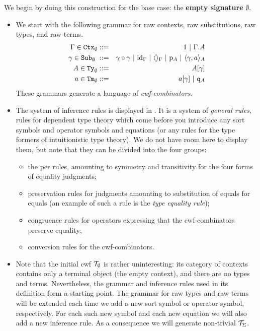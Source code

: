 \documentclass{lmcs}
\def\id{\mathrm{id}}
\begin{document}
We begin by doing this construction for the base case: the {\bf empty signature} $\emptyset$. 
\begin{itemize}
\item 
We start with the following grammar for raw contexts, raw substitutions, raw types, and raw terms.
\begin{eqnarray*}
\Gamma \in \RawCtx_\emptyset &::=& 1  \ |\ \Gamma\cext A\\
\gamma \in \RawSub_\emptyset  \ &::=& \gamma \circ \gamma \ |\ \id_\Gamma \ |\ \langle\rangle_\Gamma \ |\ \p_{A} \ |\ \langle \gamma, a \rangle_A\\
A \in \RawTy_\emptyset  &::=& A[\gamma]\\
a \in \RawTm_\emptyset  &::=& a[\gamma] \ |\ \qI_A
\end{eqnarray*}
These grammars generate a language of {\em cwf-combinators}.
\item
The system of inference rules is displayed in \cite{castellan:tlca2015,castellan:lmcs}. It is a system of {\em general rules}, rules for dependent type theory which come before you introduce any sort symbols and operator symbols and equations (or any rules for the type formers of intuitionistic type theory). We do not have room here to display them, but note that they can be divided into the four groups: 
\begin{itemize}
\item the per rules, amounting to symmetry and transitivity for the four forms of equality judgments;
\item preservation rules for judgments amounting to substitution of equals for equals (an example of such a rule is the {\em type equality rule});
\item congruence rules for operators expressing that the cwf-combinators preserve equality;
\item conversion rules for the cwf-combinators.
\end{itemize}
\item
Note that the initial cwf ${\mathcal T}_\emptyset$ is rather uninteresting: its category of contexts contains only a terminal object (the empty context), and there are no types and terms. Nevertheless, the grammar and inference rules used in its definition form a starting point. The grammar for raw types and raw terms will be extended each time we add a new sort symbol or operator symbol, respectively. For each such new symbol and each new equation we will also add a new inference rule. As a consequence we will generate non-trivial ${\mathcal T}_\Sigma$.
\end{itemize}
\end{document}
